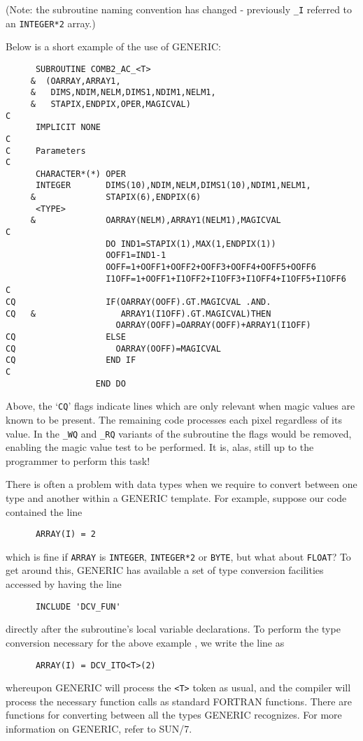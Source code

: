 (Note: the subroutine naming convention has changed - previously {\tt\_I}
referred to an {\tt INTEGER*2} array.)

Below is a short example of the use of GENERIC:

\begin{verbatim}
      SUBROUTINE COMB2_AC_<T>
     &  (OARRAY,ARRAY1,
     &   DIMS,NDIM,NELM,DIMS1,NDIM1,NELM1,
     &   STAPIX,ENDPIX,OPER,MAGICVAL)
C
      IMPLICIT NONE
C
C     Parameters
C                                                       
      CHARACTER*(*) OPER
      INTEGER       DIMS(10),NDIM,NELM,DIMS1(10),NDIM1,NELM1,
     &              STAPIX(6),ENDPIX(6)
      <TYPE>
     &              OARRAY(NELM),ARRAY1(NELM1),MAGICVAL
C
                    DO IND1=STAPIX(1),MAX(1,ENDPIX(1))
                    OOFF1=IND1-1
                    OOFF=1+OOFF1+OOFF2+OOFF3+OOFF4+OOFF5+OOFF6
                    I1OFF=1+OOFF1+I1OFF2+I1OFF3+I1OFF4+I1OFF5+I1OFF6
C
CQ                  IF(OARRAY(OOFF).GT.MAGICVAL .AND. 
CQ   &                 ARRAY1(I1OFF).GT.MAGICVAL)THEN
                      OARRAY(OOFF)=OARRAY(OOFF)+ARRAY1(I1OFF)
CQ                  ELSE
CQ                    OARRAY(OOFF)=MAGICVAL
CQ                  END IF
C
                  END DO
\end{verbatim}
Above, the `{\tt CQ}' flags indicate lines which are only relevant when magic
values are known to be present. The remaining code processes each pixel 
regardless of its value. In the {\tt \_WQ} and {\tt \_RQ} variants of the 
subroutine the flags would be removed, enabling the magic value test to be 
performed. It is, alas, still up to the programmer to perform this task!

There is often a problem with data types when we require to convert between
one type and another within a GENERIC template. For example, suppose our
code contained the line
\begin{verbatim}
      ARRAY(I) = 2
\end{verbatim}
which is fine if {\tt ARRAY} is {\tt INTEGER}, {\tt INTEGER*2} or {\tt BYTE},
but what about {\tt FLOAT}? To get around this, GENERIC has available a set
of type conversion facilities accessed by having the line
\begin{verbatim}
      INCLUDE 'DCV_FUN'
\end{verbatim}
directly after the subroutine's local variable declarations. To perform the
type conversion necessary for the above example , we write the line as
\begin{verbatim}
      ARRAY(I) = DCV_ITO<T>(2)
\end{verbatim}
whereupon GENERIC will process the {\tt <T>} token as usual, and the compiler
will process the necessary function calls as standard FORTRAN functions. There
are functions for converting between all the types GENERIC recognizes. For 
more information on GENERIC, refer to SUN/7.

